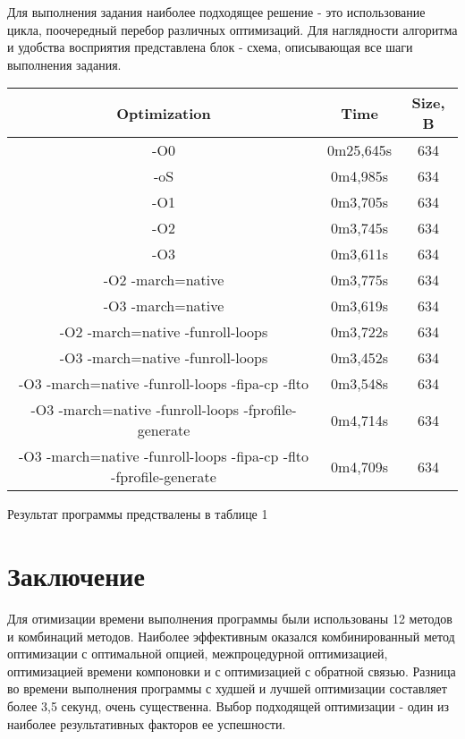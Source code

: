 \documentclass{article}
\begin{document}
\setlength{\parindent}{1.25cm}Для выполнения задания наиболее подходящее решение - это использование цикла, поочередный перебор различных оптимизаций.  Для наглядности алгоритма и удобства восприятия представлена блок - схема, описывающая все шаги выполнения задания.
\begin{center}
\begin{tabular}{ | c | c |  c | }
 \hline Optimization & Time & Size, B \\ 
 \hline -O0 & 0m25,645s & 634 \\  
 \hline -oS & 0m4,985s & 634 \\   
 \hline -O1 & 0m3,705s & 634 \\  
 \hline -O2 & 0m3,745s & 634 \\  
 \hline -O3 & 0m3,611s & 634 \\  
 \hline -O2 -march=native & 0m3,775s & 634 \\  
 \hline -O3 -march=native & 0m3,619s & 634 \\  
 \hline -O2 -march=native -funroll-loops & 0m3,722s
 & 634 \\  
 
 \hline -O3 -march=native -funroll-loops & 0m3,452s & 634 \\  
 \hline -O3 -march=native -funroll-loops -fipa-cp -flto & 0m3,548s & 634 \\  
 \hline -O3 -march=native -funroll-loops -fprofile-generate & 0m4,714s & 634 \\  
 \hline -O3 -march=native -funroll-loops -fipa-cp -flto -fprofile-generate &  0m4,709s & 634 \\  
 \hline
\end{tabular}
\end{center}
\begin{center}Результат программы предствалены в таблице 1\end{center}




\section{ Заключение}
\setlength{\parindent}{1.25cm}Для отимизации времени выполнения программы были использованы 12 методов и комбинаций методов. Наиболее эффективным оказался комбинированный метод оптимизации с оптимальной опцией, межпроцедурной оптимизацией, оптимизацией времени компоновки и с оптимизацией с обратной связью. Разница во времени выполнения программы с худшей и лучшей оптимизации составляет более 3,5 секунд,  очень существенна. Выбор подходящей оптимизации - один из наиболее результативных факторов ее успешности.\newpage
\end{document}
